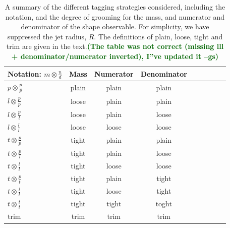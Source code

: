\documentclass[11pt,letterpaper]{article}
\newcommand{\gs}[1]{\textbf{\textcolor{darkgreen}{(#1 --gs)}}}
\begin{document}
\begin{table}[t!]
\begin{center}
\begin{tabular}{| l | c | c |c |c|c|c |c|r| }
  \hline                       
  Notation: $m \otimes \frac{n}{d}$ & Mass & Numerator & Denominator\\
  \hline
  $p \otimes \frac{p}{p}$ & plain  &  plain & plain \\
  $l \otimes \frac{p}{p}$ & loose  &  plain & plain \\
  $l \otimes \frac{p}{l}$ & loose  &  plain & loose \\
  $l \otimes \frac{l}{l}$ & loose  &  loose & loose \\
  $t \otimes \frac{p}{p}$ & tight  &  plain & plain \\
  $t \otimes \frac{p}{l}$ & tight  &  plain & loose \\
  $t \otimes \frac{l}{l}$ & tight  &  loose & loose \\
  $t \otimes \frac{p}{t}$ & tight  &  plain & tight \\
  $t \otimes \frac{l}{t}$ & tight  &  loose & tight \\
  $t \otimes \frac{t}{t}$ & tight  &  tight & toght \\
  $\text{trim}$ & trim &  trim & trim \\
  \hline  
\end{tabular}
\end{center}
\caption{ A summary of the different tagging strategies considered,
  including the notation, and the degree of grooming for the mass, and
  numerator and denominator of the shape observable. For simplicity,
  we have suppressed the jet radius, $R$. The definitions of plain,
  loose, tight and trim are given in the text.\gs{The table was not
    correct (missing lll + denominator/numerator inverted), I''ve
    updated it} }
\label{tab:tag_summary}
\end{table}
\end{document}
